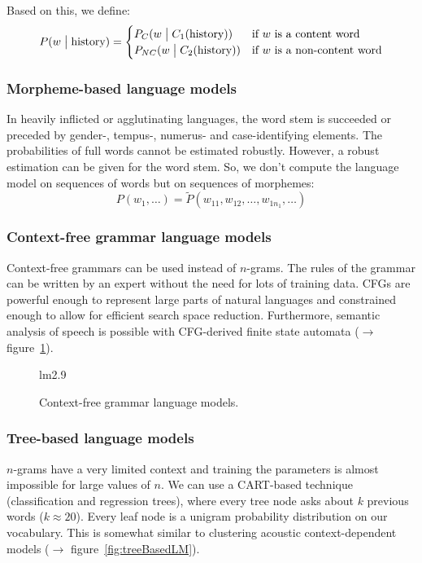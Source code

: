 \documentclass[11pt]{article}
\begin{document}
Based on this, we define:
\[
    P(w \bigm| \mbox{history}) = \begin{cases}
        P_C(w \bigm| C_1(\mbox{history})) & \mbox{if $w$ is a content word} \\
        P_{NC}(w \bigm| C_2(\mbox{history})) & \mbox{if $w$ is a non-content word}
    \end{cases}
\]

\subsubsection{Morpheme-based language models}
In heavily inflicted or agglutinating languages, the word stem is succeeded or preceded by gender-, tempus-, numerus- and case-identifying elements. The probabilities of full words cannot be estimated robustly. However, a robust estimation can be given for the word stem. So, we don't compute the language model on sequences of words but on sequences of morphemes:
\[
    P(w_1, \ldots) = \tilde{P}(w_{11}, w_{12}, \ldots, w_{1n_1}, \ldots)
\]

\subsubsection{Context-free grammar language models}
Context-free grammars can be used instead of $n$-grams. The rules of the grammar can be written by an expert without the need for lots of training data. CFGs are powerful enough to represent large parts of natural languages and constrained enough to allow for efficient search space reduction. Furthermore, semantic analysis of speech is possible with CFG-derived finite state automata ($\to$ figure~\ref{fig:contextFreeGrammarLM}).

\begin{figure}[htb]
    \begin{minipage}{\linewidth}
        \vspace{4cm}
        \hfill \scriptsize lm2.9
    \end{minipage}
    \caption{\label{fig:contextFreeGrammarLM} Context-free grammar language models.}
\end{figure}

\subsubsection{Tree-based language models}
$n$-grams have a very limited context and training the parameters is almost impossible for large values of $n$. We can use a CART-based technique (classification and regression trees), where every tree node asks about $k$ previous words ($k \approx 20$). Every leaf node is a unigram probability distribution on our vocabulary. This is somewhat similar to clustering acoustic context-dependent models ($\to$ figure~\ref{fig:treeBasedLM}).
\end{document}
